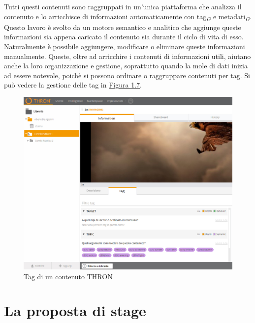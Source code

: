 \documentclass[a4paper, 12pt, twoside, openright]{book}
\newcommand{\gloss}[1]{#1\textsubscript{\textit{\tiny{G}}}}
\begin{document}
Tutti questi contenuti sono raggruppati in un'unica piattaforma che analizza il contenuto e lo arricchisce di informazioni automaticamente con \gloss{tag} e \gloss{metadati}. Questo lavoro è svolto da un motore semantico e analitico che aggiunge queste informazioni sia appena caricato il contenuto sia durante il ciclo di vita di esso. Naturalmente è possibile aggiungere, modificare o eliminare queste informazioni manualmente. Queste, oltre ad arricchire i contenuti di informazioni utili, aiutano anche la loro organizzazione e gestione, soprattutto quando la mole di dati inizia ad essere notevole, poichè si possono ordinare o raggruppare contenuti per tag. Si può vedere la gestione delle tag in \hyperref[content-tags]{Figura 1.7}.
\begin{figure}[H]
	\centering
	\label{content-tags}
	\includegraphics[width=1.0\textwidth]{images/content-tags.jpg}
	\caption{Tag di un contenuto THRON}
\end{figure}

\chapter{La proposta di stage}
\end{document}

